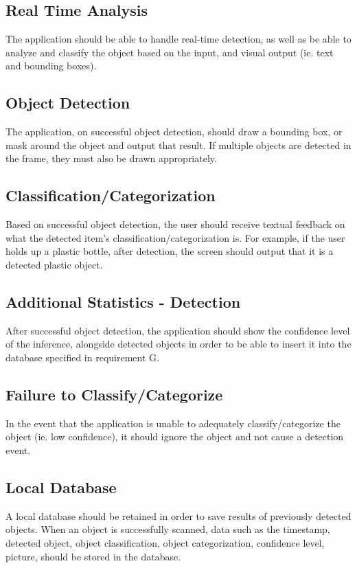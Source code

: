 \documentclass[conference]{IEEEtran}
\begin{document}
\subsection{Real Time Analysis}

The application should be able to handle real-time detection, as well as be able to analyze and classify the object based on the input, and  visual output (ie. text and bounding boxes). 
\newline
\subsection{Object Detection}

The application, on successful object detection, should draw a bounding box, or mask around the object and output that result. If multiple objects are detected in the frame, they must also be drawn appropriately.
\newline
\subsection{Classification/Categorization}

Based on successful object detection, the user should receive textual feedback on what the detected item's classification/categorization is. For example, if the user holds up a plastic bottle, after detection, the screen should output that it is a detected plastic object.
\newline
\subsection{Additional Statistics - Detection}

After successful object detection, the application should show the confidence level of the inference, alongside detected objects in order to be able to insert it into the database specified in requirement G.
\newline
\subsection{Failure to Classify/Categorize}

In the event that the application is unable to adequately classify/categorize the object (ie. low confidence), it should ignore the object and not cause a detection event.
\newline
\subsection{Local Database}
A local database should be retained in order to save results of previously detected objects. When an object is successfully scanned, data such as the timestamp, detected object, object classification, object categorization, confidence level, picture, should be stored in the database.
\end{document}
